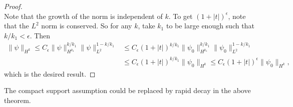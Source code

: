 \begin{proof}
\[  \]
  Note that the growth of the norm is independent of
  $k$.
  To get $(1 + |t|)^\epsilon$, note that the
  $L^2$ norm is conserved. So for any $k$, take
  $k_1$ to be large enough such that $k / k_1 < \epsilon$.
  Then
  \begin{align*}
    \|\psi\|_{H^k}
    \le C_\epsilon \|\psi\|^{k / k_1}_{H^{k_1}} \|\psi\|_{L^2}^{1 - k / k_1}
    &\le C_\epsilon (1 + |t|)^{k / k_1} \|\psi_0\|_{H^{k_1}}^{k / k_1} \|\psi_0\|_{L^2}^{1 - k / k_1} \\
    &\le C_\epsilon (1 + |t|)^{k / k_1} \|\psi_0\|_{H^k}
    \le C_\epsilon (1 + |t|)^\epsilon \|\psi_0\|_{H^k},
  \end{align*}
  which is the desired result.
\end{proof}

\begin{remark}
  The compact support assumption could be replaced
  by rapid decay in the above theorem.
\end{remark}
